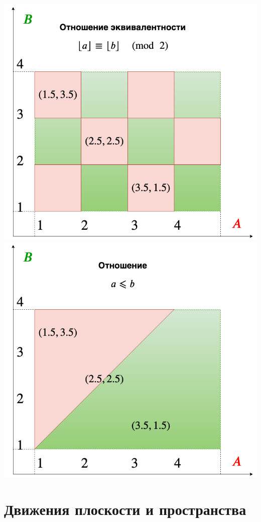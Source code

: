 \begin{center}
\includegraphics[scale=0.25]{equiv.png}
\includegraphics[scale=0.25]{lessthan.png}
\end{center}





\chapter{Движения плоскости и пространства}

